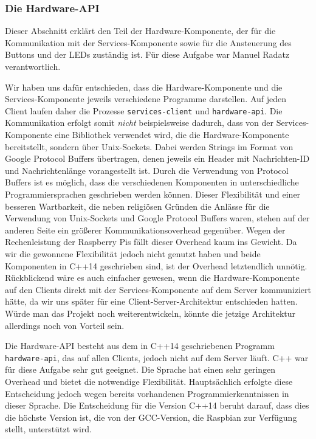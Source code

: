 \subsubsection{Die Hardware-API}
\label{sec:hardware-api}

Dieser Abschnitt erklärt den Teil der Hardware-Komponente, der für die Kommunikation mit der
Services-Komponente sowie für die Ansteuerung des Buttons und der LEDs zuständig ist.
Für diese Aufgabe war Manuel Radatz verantwortlich.

Wir haben uns dafür entschieden, dass die Hardware-Komponente und die Services-Komponente jeweils
verschiedene Programme darstellen.
Auf jeden Client laufen daher die Prozesse \texttt{services-client} und \texttt{hardware-api}.
Die Kommunikation erfolgt somit \textit{nicht} beispielsweise dadurch, dass von der
Services-Komponente eine Bibliothek verwendet wird, die die Hardware-Komponente bereitstellt,
sondern über Unix-Sockets.
Dabei werden Strings im Format von Google Protocol Buffers übertragen, denen jeweils ein Header mit
Nachrichten-ID und Nachrichtenlänge vorangestellt ist.
Durch die Verwendung von Protocol Buffers ist es möglich, dass die verschiedenen Komponenten in
unterschiedliche Programmiersprachen geschrieben werden können.
Dieser Flexibilität und einer besseren Wartbarkeit, die neben religiösen Gründen die Anlässe für
die Verwendung von Unix-Sockets und Google Protocol Buffers waren, stehen auf der anderen Seite ein
größerer Kommunikationsoverhead gegenüber.
Wegen der Rechenleistung der Raspberry Pis fällt dieser Overhead kaum ins Gewicht.
Da wir die gewonnene Flexibilität jedoch nicht genutzt haben und beide Komponenten in C++14
geschrieben sind, ist der Overhead letztendlich unnötig.
Rückblickend wäre es auch einfacher gewesen, wenn die Hardware-Komponente auf den Clients direkt
mit der Services-Komponente auf dem Server kommuniziert hätte, da wir uns später für eine
Client-Server-Architektur entschieden hatten.
Würde man das Projekt noch weiterentwickeln, könnte die jetzige Architektur allerdings noch von
Vorteil sein.

Die Hardware-API besteht aus dem in C++14 geschriebenen Programm \texttt{hardware-api}, das auf
allen Clients, jedoch nicht auf dem Server läuft.
C++ war für diese Aufgabe sehr gut geeignet.
Die Sprache hat einen sehr geringen Overhead und bietet die notwendige Flexibilität.
Hauptsächlich erfolgte diese Entscheidung jedoch wegen bereits vorhandenen Programmierkenntnissen
in dieser Sprache.
Die Entscheidung für die Version C++14 beruht darauf, dass dies die höchste Version ist, die von der
GCC-Version, die Raspbian zur Verfügung stellt, unterstützt wird.


